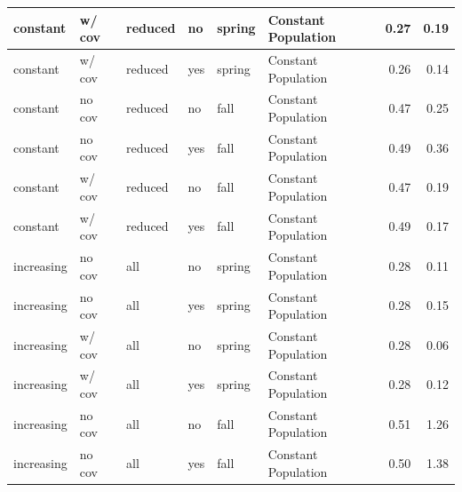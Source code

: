 \documentclass[
  12pt,
]{article}
\begin{document}
\begin{table}
\begin{tabular}{l|l|l|l|l|l|r|r}
\hline
\hspace{1em}\hspace{1em}constant & w/ cov & reduced & no & spring & Constant Population & 0.27 & 0.19\\
\hline
\hspace{1em}\hspace{1em}constant & w/ cov & reduced & yes & spring & Constant Population & 0.26 & 0.14\\
\hline
\hspace{1em}\hspace{1em}constant & no cov & reduced & no & fall & Constant Population & 0.47 & 0.25\\
\hline
\hspace{1em}\hspace{1em}constant & no cov & reduced & yes & fall & Constant Population & 0.49 & 0.36\\
\hline
\hspace{1em}\hspace{1em}constant & w/ cov & reduced & no & fall & Constant Population & 0.47 & 0.19\\
\hline
\hspace{1em}\hspace{1em}constant & w/ cov & reduced & yes & fall & Constant Population & 0.49 & 0.17\\
\hline
\hspace{1em}\hspace{1em}increasing & no cov & all & no & spring & Constant Population & 0.28 & 0.11\\
\hline
\hspace{1em}\hspace{1em}increasing & no cov & all & yes & spring & Constant Population & 0.28 & 0.15\\
\hline
\hspace{1em}\hspace{1em}increasing & w/ cov & all & no & spring & Constant Population & 0.28 & 0.06\\
\hline
\hspace{1em}\hspace{1em}increasing & w/ cov & all & yes & spring & Constant Population & 0.28 & 0.12\\
\hline
\hspace{1em}\hspace{1em}increasing & no cov & all & no & fall & Constant Population & 0.51 & 1.26\\
\hline
\hspace{1em}\hspace{1em}increasing & no cov & all & yes & fall & Constant Population & 0.50 & 1.38\\

\end{tabular}
\end{table}
\end{document}

